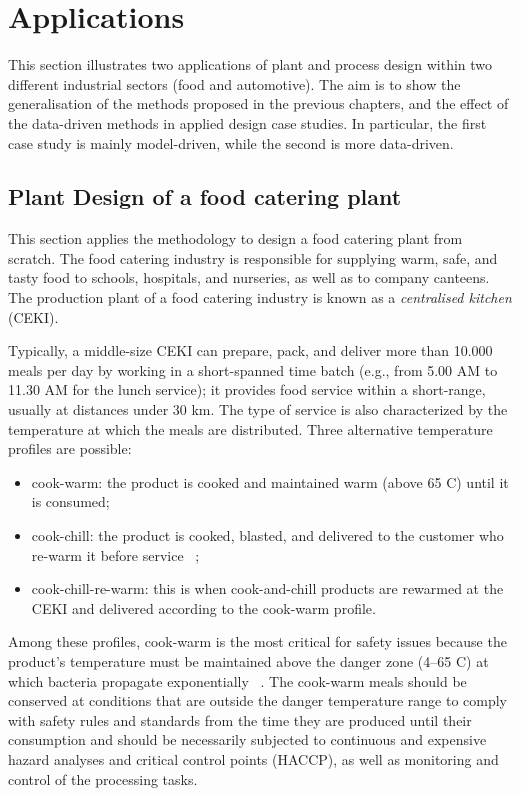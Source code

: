 \section{Applications}
This section illustrates two applications of plant and process design within two different industrial sectors (food and automotive). The aim is to show the generalisation of the methods proposed in the previous chapters, and the effect of the data-driven methods in applied design case studies. In particular, the first case study is mainly model-driven, while the second is more data-driven.

\subsection{Plant Design of a food catering plant} \label{secCateringDesign}

This section applies the methodology to design a food catering plant from scratch. The food catering industry is responsible for supplying warm, safe, and tasty food to schools, hospitals, and nurseries, as well as to company canteens. The production plant of a food catering industry is known as a \textit{centralised kitchen} (CEKI).\par

Typically, a middle-size CEKI can prepare, pack, and deliver more than 10.000 meals per day by working in a short-spanned time batch (e.g., from 5.00 AM to 11.30 AM for the lunch service); it provides food service within a short-range, usually at distances under 30 km. The type of service is also characterized by the temperature at which the meals are distributed. Three alternative temperature profiles are possible:  

\begin{itemize}
    \item cook-warm: the product is cooked and maintained warm (above 65 \degree C) until it is consumed; 
    \item cook-chill: the product is cooked, blasted, and delivered to the customer who re-warm it before service ~\cite{Williams1996};
    \item cook-chill-re-warm: this is when cook-and-chill products are rewarmed at the CEKI and delivered according to the cook-warm profile.
\end{itemize}

Among these profiles, cook-warm is the most critical for safety issues because the product’s temperature must be maintained above the danger zone (4–65 \degree C) at which bacteria propagate exponentially ~\cite{Rahman2002}. The cook-warm meals should be conserved at conditions that are outside the danger temperature range to comply with safety rules and standards from the time they are produced until their consumption and should be necessarily subjected to continuous and expensive hazard analyses and critical control points (HACCP), as well as monitoring and control of the processing tasks. \par


